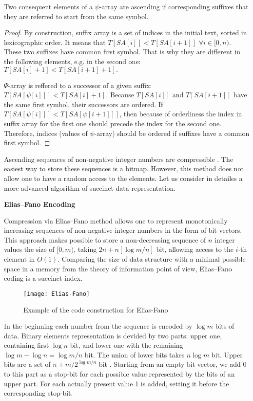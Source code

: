 \begin{theorem}
 \label{lemma:1}
 Two consequent elements of a $\psi$-array are ascending if corresponding suffixes that they are referred to
 start from the same symbol.
\end{theorem}

\begin{proof}
    By construction, suffix array is a set of indices in the initial text,
    sorted in lexicographic order. It means that $T[SA[i]] < T[SA[i + 1]]$
    $\forall i \in [0, n).$ These two suffixes have common first symbol.
    That is why they are different in the following elements, e.g. in the second one:
    $T[SA[i] + 1] < T[SA[i + 1] + 1].$

    $\Psi$-array is reffered to a successor of a given suffix: $T[SA[\psi[i]]] < T[SA[i] + 1].$
    Because $T[SA[i]]$ and $T[SA[i + 1]]$ have the same first symbol, their successors are ordered.
    If $T[SA[\psi[i]]] < T[SA[\psi[i + 1]]]$, then because of orderliness the index in suffix array
    for the first one should precede the index for the second one. Therefore, indices (values of $\psi$-array)
    should be ordered if suffixes have a common first symbol.
\end{proof}

Ascending sequences of non-negative integer numbers are compressible \cite{andersensimple}.
The easiest way to store these sequences is a bitmap.
However, this method does not allow one to have a random access to the elements.
Let us consider in detailes a more advanced algorithm of succinct data representation.

\textbf{Elias--Fano Encoding}

Compression via Elias--Fano method \cite{pibiri2014dynamic}
allows one to represent monotonically increasing sequences
of non-negative integer numbers in the form of bit vectors. This approach makes possible to
store a non-decreasing sequence of $n$ integer values the size of $[0, m)$,
taking $2n + n[\log m/n]$ bit, allowing access to the $i$-th element in $O(1)$.
Comparing the size of data structure with a minimal possible space in a memory
from the theory of information point of view, Elias--Fano coding is a succinct index.

\begin{figure}[t]
 \texttt{[image: Elias-Fano]}
 \caption{Example of the code construction for Elias-Fano}
 \centering
 \label{fig:EF}
\end{figure}

In the beginning each number from the sequence is encoded by $\log m$ bits of data.
Binary elements representation is devided by two parts: upper one, containing
first $\log n$ bit, and lower one with the remaining $\log m - \log n = \log m / n$ bit.
The union of lower bits takes $n \log m$ bit. Upper bits are a set of 
$n + m / 2^{\log m/n}$ bit \cite{antonio2018integers}.
Starting from an empty bit vector, we add 0 to this part as a stop-bit
for each possible value represented by the bits of an upper part.
For each actually present value 1 is added, setting it before the corresponding stop-bit.

